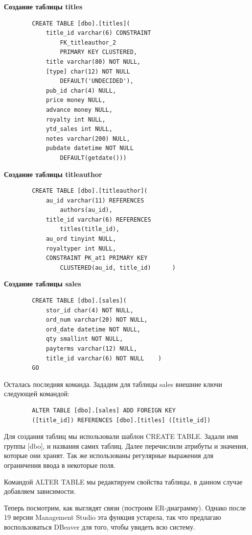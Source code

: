 \textbf{Создание таблицы titles}
\begin{verbatim}
        CREATE TABLE [dbo].[titles](
            title_id varchar(6) CONSTRAINT 
                FK_titleauthor_2 
                PRIMARY KEY CLUSTERED,
            title varchar(80) NOT NULL,
            [type] char(12) NOT NULL 
                DEFAULT('UNDECIDED'),
            pub_id char(4) NULL,
            price money NULL,
            advance money NULL,
            royalty int NULL,
            ytd_sales int NULL,
            notes varchar(200) NULL,
            pubdate datetime NOT NULL 
                DEFAULT(getdate()))
\end{verbatim}

\textbf{Создание таблицы titleauthor}
\begin{verbatim}
        CREATE TABLE [dbo].[titleauthor](
            au_id varchar(11) REFERENCES 
                authors(au_id),
            title_id varchar(6) REFERENCES 
                titles(title_id),
            au_ord tinyint NULL,
            royaltyper int NULL,
            CONSTRAINT PK_at1 PRIMARY KEY 
                CLUSTERED(au_id, title_id)		)
\end{verbatim}

\textbf{Создание таблицы sales}
\begin{verbatim}
        CREATE TABLE [dbo].[sales](
            stor_id char(4) NOT NULL,
            ord_num varchar(20) NOT NULL,
            ord_date datetime NOT NULL,
            qty smallint NOT NULL,
            payterms varchar(12) NULL,
            title_id varchar(6) NOT NULL	)
        GO
\end{verbatim}

Осталась последняя команда. Зададим для таблицы sales внешние ключи следующей командой:
\begin{verbatim}
        ALTER TABLE [dbo].[sales] ADD FOREIGN KEY
        ([title_id]) REFERENCES [dbo].[titles] ([title_id])
\end{verbatim}

Для создания таблиц мы использовали шаблон CREATE TABLE. Задали имя группы [dbo], и названия самих таблиц. Далее перечислили атрибуты и значения, которые они хранят. Так же использованы регулярные выражения для ограничения ввода в некоторые поля. 

Командой ALTER TABLE мы редактируем свойства таблицы, в данном случае добавляем зависимости. 

Теперь посмотрим, как выглядят связи (построим ER-диаграмму). Однако после 19 версии Management Studio эта функция устарела, так что предлагаю воспользоваться DBeaver для того, чтобы увидеть всю систему. 


